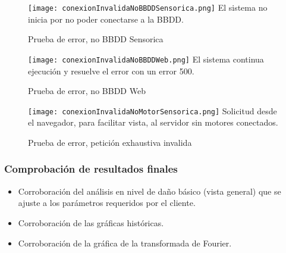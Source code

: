     \begin{figure}[htb]
		\centering
        \caption{Prueba de error, no BBDD Sensorica}
        \texttt{[image: conexionInvalidaNoBBDDSensorica.png]}
        El sistema no inicia por no poder conectarse a la BBDD.
        \label{NoBBDDSensorica}
	\end{figure}

    \begin{figure}[htb]
		\centering
        \caption{Prueba de error, no BBDD Web}
        \texttt{[image: conexionInvalidaNoBBDDWeb.png]}
        El sistema continua ejecución y resuelve el error con un error 500.
        \label{NoBBDDWeb}
	\end{figure}

    \begin{figure}[htb]
		\centering
        \caption{Prueba de error, petición exhaustiva invalida}
        \texttt{[image: conexionInvalidaNoMotorSensorica.png]}
        Solicitud desde el navegador, para facilitar vista, al servidor
        sin motores conectados.
        \label{ErrorExhaustiva}
	\end{figure}


\subsubsection{Comprobación de resultados finales}
\begin{itemize}
    \item Corroboración del análisis en nivel de daño básico (vista general)
        que se ajuste a los parámetros requeridos por el cliente.
    \item Corroboración de las gráficas históricas.
    \item Corroboración de la gráfica de la transformada de Fourier.
\end{itemize}


